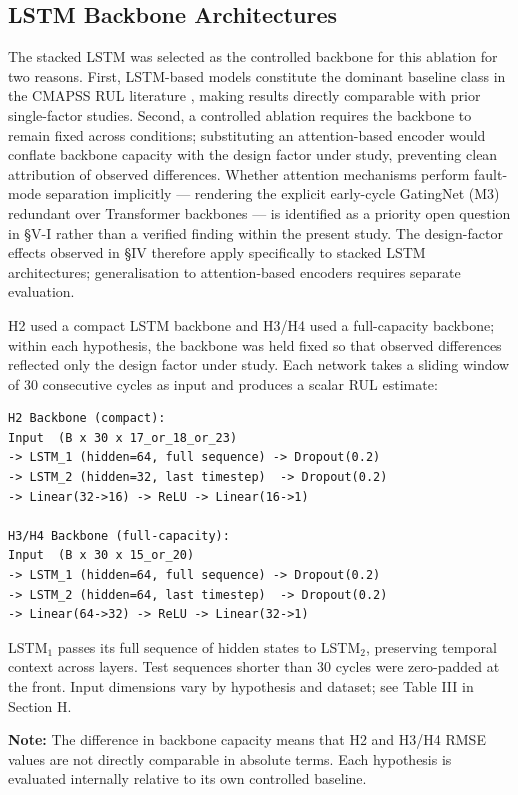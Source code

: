 \documentclass[review,12pt]{elsarticle}
\begin{document}
\subsection{LSTM Backbone Architectures}

The stacked LSTM was selected as the controlled backbone for this ablation for two reasons. First, LSTM-based models constitute the dominant baseline class in the CMAPSS RUL literature \cite{ref05,ref06,ref09}, making results directly comparable with prior single-factor studies. Second, a controlled ablation requires the backbone to remain fixed across conditions; substituting an attention-based encoder would conflate backbone capacity with the design factor under study, preventing clean attribution of observed differences. Whether attention mechanisms perform fault-mode separation implicitly --- rendering the explicit early-cycle GatingNet (M3) redundant over Transformer backbones --- is identified as a priority open question in \S{}V-I rather than a verified finding within the present study. The design-factor effects observed in \S{}IV therefore apply specifically to stacked LSTM architectures; generalisation to attention-based encoders requires separate evaluation.

H2 used a compact LSTM backbone and H3/H4 used a full-capacity backbone; within each hypothesis, the backbone was held fixed so that observed differences reflected only the design factor under study. Each network takes a sliding window of 30 consecutive cycles as input and produces a scalar RUL estimate:
{\small\begin{verbatim}
H2 Backbone (compact):
Input  (B x 30 x 17_or_18_or_23)
-> LSTM_1 (hidden=64, full sequence) -> Dropout(0.2)
-> LSTM_2 (hidden=32, last timestep)  -> Dropout(0.2)
-> Linear(32->16) -> ReLU -> Linear(16->1)

H3/H4 Backbone (full-capacity):
Input  (B x 30 x 15_or_20)
-> LSTM_1 (hidden=64, full sequence) -> Dropout(0.2)
-> LSTM_2 (hidden=64, last timestep)  -> Dropout(0.2)
-> Linear(64->32) -> ReLU -> Linear(32->1)
\end{verbatim}
}

LSTM$_1$ passes its full sequence of hidden states to LSTM$_2$, preserving temporal context across layers. Test sequences shorter than 30 cycles were zero-padded at the front. Input dimensions vary by hypothesis and dataset; see Table III in Section H.

\textbf{Note:} The difference in backbone capacity means that H2 and H3/H4 RMSE values are not directly comparable in absolute terms. Each hypothesis is evaluated internally relative to its own controlled baseline.
\end{document}
